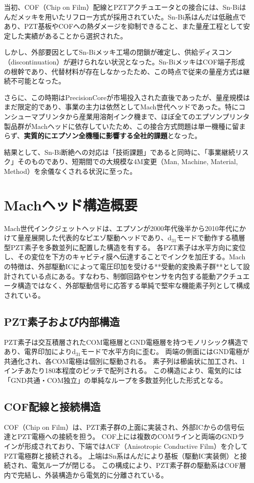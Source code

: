 \documentclass[conference]{IEEEtran}
\begin{document}
当初、COF（Chip on Film）配線とPZTアクチュエータとの接合には、Sn-Biはんだメッキを用いたリフロー方式が採用されていた。Sn-Bi系はんだは低融点であり、PZT基板やCOFへの熱ダメージを抑制できること、また量産工程として安定した実績があることから選択された。  

しかし、外部要因としてSn-Biメッキ工場の閉鎖が確定し、供給ディスコン（discontinuation）が避けられない状況となった。Sn-BiメッキはCOF端子形成の根幹であり、代替材料が存在しなかったため、この時点で従来の量産方式は継続不可能となった。  

さらに、この時期はPrecisionCoreが市場投入された直後であったが、量産規模はまだ限定的であり、事業の主力は依然としてMach世代ヘッドであった。特にコンシューマプリンタから産業用溶剤インク機まで、ほぼ全てのエプソンプリンタ製品群がMachヘッドに依存していたため、この接合方式問題は単一機種に留まらず、\textbf{実質的にエプソン全機種に影響する全社的課題}となった。  

結果として、Sn-Bi断絶への対応は「技術課題」であると同時に、「事業継続リスク」そのものであり、短期間での大規模な4M変更（Man, Machine, Material, Method）を余儀なくされる状況に至った。

\section{Machヘッド構造概要}
Mach世代インクジェットヘッドは、エプソンが2000年代後半から2010年代にかけて量産展開した代表的なピエゾ駆動ヘッドであり、d$_{31}$モードで動作する積層型PZT素子を多数並列に配置した構造を有する。  
各PZT素子は水平方向に変位し、その変位を下方のキャビティ膜へ伝達することでインクを加圧する。Machの特徴は、外部駆動ICによって電圧印加を受ける**受動的変換素子群**として設計されている点にある。すなわち、制御回路やセンサを内包する能動アクチュエータ構造ではなく、外部駆動信号に応答する単純で堅牢な機能素子列として構成されている。

\subsection{PZT素子および内部構造}
PZT素子は交互積層されたCOM電極層とGND電極層を持つモノリシック構造であり、電界印加によりd$_{31}$モードで水平方向に歪む。  
両端の側面にはGND電極が共通化され、各COM電極は個別に駆動される。  
素子列は櫛歯状に加工され、1インチあたり180本程度のピッチで配列される。  
この構造により、電気的には「GND共通・COM独立」の単純なループを多数並列化した形式となる。

\subsection{COF配線と接続構造}
COF（Chip on Film）は、PZT素子群の上面に実装され、外部ICからの信号伝達とPZT電極への接続を担う。  
COF上には複数のCOMラインと両端のGNDラインが形成されており、下端ではACF（Anisotropic Conductive Film）を介してPZT電極群と接続される。  
上端はSn系はんだにより基板（駆動IC実装側）と接続され、電気ループが閉じる。  
この構成により、PZT素子群の駆動系はCOF層内で完結し、外装構造から電気的に分離されている。
\end{document}
